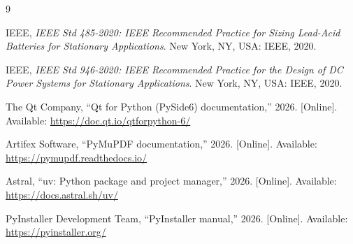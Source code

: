 \begin{thebibliography}{9}

IEEE, \emph{IEEE Std 485-2020: IEEE Recommended Practice for Sizing Lead-Acid
Batteries for Stationary Applications}. New York, NY, USA: IEEE, 2020.

IEEE, \emph{IEEE Std 946-2020: IEEE Recommended Practice for the Design of DC Power
Systems for Stationary Applications}. New York, NY, USA: IEEE, 2020.

The Qt Company, ``Qt for Python (PySide6) documentation,'' 2026. [Online].
Available: \url{https://doc.qt.io/qtforpython-6/}

Artifex Software, ``PyMuPDF documentation,'' 2026. [Online].
Available: \url{https://pymupdf.readthedocs.io/}

Astral, ``uv: Python package and project manager,'' 2026. [Online].
Available: \url{https://docs.astral.sh/uv/}

PyInstaller Development Team, ``PyInstaller manual,'' 2026. [Online].
Available: \url{https://pyinstaller.org/}

\end{thebibliography}
